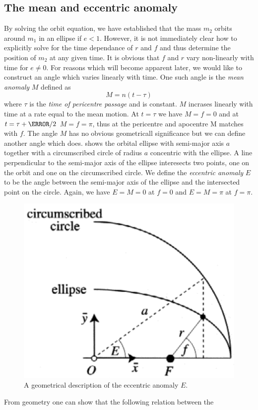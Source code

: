 \subsection{The mean and eccentric anomaly}
By solving the orbit equation, we have established that the mass $m_2$ orbits 
around $m_1$ in an ellipse if $e<1$. However, it is not immediately clear how
to explicitly solve for the time dependance of $r$ and $f$ and thus determine 
the position of $m_2$ at any given time. It is obvious that $f$ and $r$ vary
non-linearly with time for $e\neq 0$. For reasons which will become apparent 
later, we would like to construct an angle which varies linearly with time.
One such angle is the \emph{mean anomaly} $M$ defined as
\begin{equation}
    M=n(t-\tau)
\label{eq:mean_anomaly}
\end{equation}
where $\tau$ is the \emph{time of pericentre passage} and is constant. $M$
incrases linearly with time at a rate equal to the mean motion. At $t=\tau$ 
we have $M=f=0$
and at $t=\tau + \T/2$ $M=f=\pi$, thus at the pericentre and apocentre 
M matches with $f$. The angle $M$ has no obvious geometricall significance
but we can define another angle which does.  
shows the orbital ellipse with semi-major axis $a$ together with a 
circumscribed circle of radius $a$ concentric with the ellipse. A line 
perpendicular to the semi-major axis of the ellipse interesects two points,
one on the orbit and one on the circumscribed circle. We define the 
\emph{eccentric anomaly} $E$ to be the angle between the semi-major axis
of the ellipse and the intersected point on the circle. Again, we have
$E=M=0$ at $f=0$ and $E=M=\pi$ at $f=\pi$. 
\begin{figure}[htb]
\centering
\includegraphics[width=0.5\linewidth]{gfx/eccentric_anomaly.png}
\caption{A geometrical description of the eccentric anomaly $E$.}
\label{fig:eccentric_anomaly}
\end{figure}
From geometry one can show that the following relation between the
